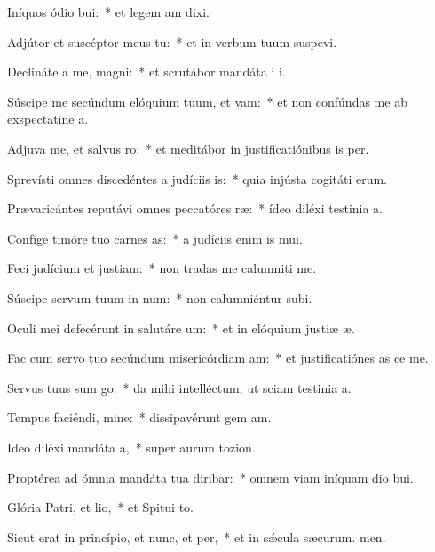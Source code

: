 \item Iníquos ódio bui:~* et legem am dixi.
\item Adjútor et suscéptor meus  tu:~* et in verbum tuum suspevi.
\item Declináte a me, magni:~* et scrutábor mandáta i i.
\item Súscipe me secúndum elóquium tuum, et vam:~* et non confúndas me ab exspectatine a.
\item Adjuva me, et salvus ro:~* et meditábor in justificatiónibus is per.
\item Sprevísti omnes discedéntes a judíciis is:~* quia injústa cogitáti erum.
\item Prævaricántes reputávi omnes peccatóres ræ:~* ídeo diléxi testinia a.
\item Confíge timóre tuo carnes as:~* a judíciis enim is mui.
\item Feci judícium et justiam:~* non tradas me calumniti me.
\item Súscipe servum tuum in num:~* non calumniéntur  subi.
\item Oculi mei defecérunt in salutáre um:~* et in elóquium justiæ æ.
\item Fac cum servo tuo secúndum misericórdiam am:~* et justificatiónes as ce me.
\item Servus tuus sum go:~* da mihi intelléctum, ut sciam testinia a.
\item Tempus faciéndi, mine:~* dissipavérunt gem am.
\item Ideo diléxi mandáta a,~* super aurum  tozion.
\item Proptérea ad ómnia mandáta tua diribar:~* omnem viam iníquam dio bui.
\item Glória Patri, et lio,~* et Spitui to.
\item Sicut erat in princípio, et nunc, et per,~* et in sǽcula sæcurum. men.
